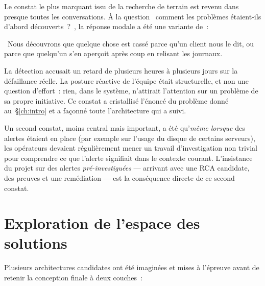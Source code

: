 \documentclass[11pt,a4paper,oneside]{report}
\begin{document}
Le constat le plus marquant issu de la recherche de terrain est
revenu dans presque toutes les conversations. À la question \og~comment
les problèmes étaient-ils d'abord découverts~?~\fg{}, la réponse
modale a été une variante de~:

\begin{notebox}[title={Constat récurrent des entretiens}]
\og~Nous découvrons que quelque chose est cassé parce qu'un client
nous le dit, ou parce que quelqu'un s'en aperçoit après coup en
relisant les journaux.~\fg{}
\end{notebox}

La détection accusait un retard de plusieurs heures à plusieurs
jours sur la défaillance réelle. La posture réactive de l'équipe
était structurelle, et non une question d'effort~: rien, dans le
système, n'attirait l'attention sur un problème de sa propre
initiative. Ce constat a cristallisé l'énoncé du problème donné
au~\S\ref{ch:intro} et a façonné toute l'architecture qui a suivi.

Un second constat, moins central mais important, a été qu'\emph{même
lorsque} des alertes étaient en place (par exemple sur l'usage du
disque de certains serveurs), les opérateurs devaient régulièrement
mener un travail d'investigation non trivial pour comprendre ce que
l'alerte signifiait dans le contexte courant. L'insistance du projet
sur des alertes \emph{pré-investiguées} --- arrivant avec une RCA
candidate, des preuves et une remédiation --- est la conséquence
directe de ce second constat.

\section{Exploration de l'espace des solutions}

Plusieurs architectures candidates ont été imaginées et mises à
l'épreuve avant de retenir la conception finale à deux couches~:
\end{document}
